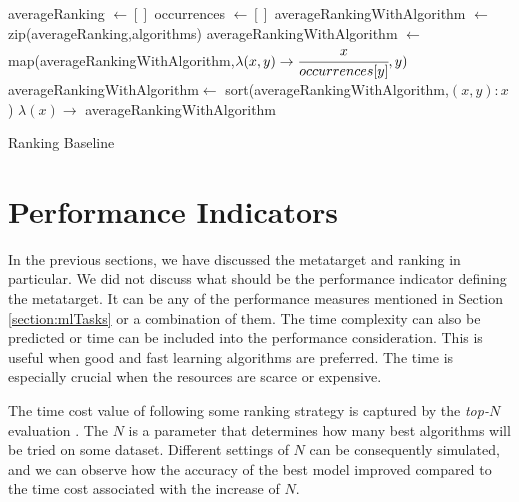 \begin{algorithm}
	\BlankLine
	averageRanking $\leftarrow []$\;
	occurrences $\leftarrow []$\;
	averageRankingWithAlgorithm $\leftarrow$ zip(averageRanking,algorithms)\;
	averageRankingWithAlgorithm $\leftarrow$ map(averageRankingWithAlgorithm,$\lambda(x,y)\rightarrow \cfrac{x}{occurrences[y]},y)$\;
	averageRankingWithAlgorithm$\leftarrow$ sort(averageRankingWithAlgorithm,$(x,y):x$)\;
	\Return $\lambda(x) \rightarrow $ averageRankingWithAlgorithm\;
	\caption{Ranking Baseline}\label{algo:rankingBaseline}
\end{algorithm}\DecMargin{1em}

\section{Performance Indicators}
In the previous sections, we have discussed the metatarget and ranking in particular. We did not discuss what should be the performance indicator defining the metatarget. It can be any of the performance measures mentioned in Section \ref{section:mlTasks} or a combination of them. The time complexity can also be predicted or time can be included into the performance consideration. This is useful when good and fast learning algorithms are preferred.  The time is especially crucial when the resources are scarce or expensive.

The time cost value of following some ranking strategy is captured by the \emph{top-$N$} evaluation \cite{topNEvaluation}. The $N$ is a parameter that determines how many best algorithms will be tried on some dataset. Different settings of $N$ can be consequently simulated, and we can observe how the accuracy of the best model improved compared to the time cost associated with the increase of $N$.

